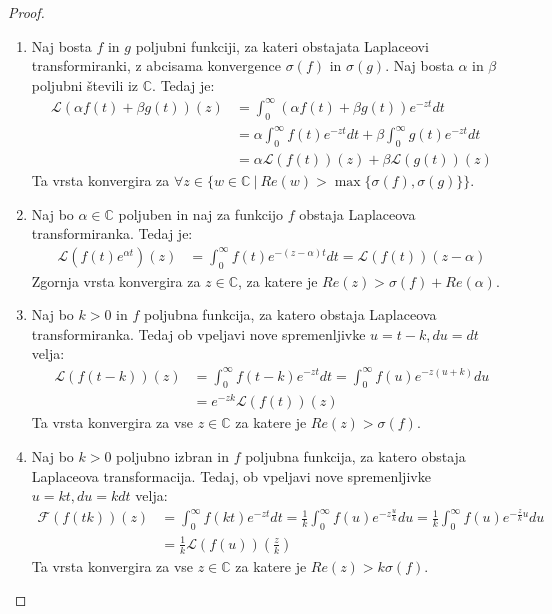 \documentclass[a4paper, 10pt]{article}
\newcommand{\mth}[1]{\ensuremath{\mathbb{#1}}}
\newcommand{\C}{\mth{C}}
\begin{document}
			\begin{proof}
				\begin{enumerate}
					\item Naj bosta $f$ in $g$ poljubni funkciji, za kateri obstajata Laplaceovi transformiranki, z abcisama konvergence $\sigma(f)$ in $\sigma(g)$. Naj bosta $\alpha$ in $\beta$ poljubni števili iz $\C$. Tedaj je: \begin{align*}
						\mathcal{L}(\alpha f(t) + \beta g(t))(z) &= \int_{0}^{\infty}(\alpha f(t) + \beta g(t))e^{-zt}dt \\
						&= \alpha\int_{0}^{\infty}f(t)e^{-zt}dt + \beta\int_{0}^{\infty}g(t)e^{-zt}dt \\
						&= \alpha\mathcal{L}(f(t))(z) + \beta\mathcal{L}(g(t))(z)
					\end{align*}
					Ta vrsta konvergira za $\forall z\in\{w\in\C~|~Re(w) > \max\{\sigma(f), \sigma(g)\}\}$.
					\item Naj bo $\alpha\in\C$ poljuben in naj za funkcijo $f$ obstaja Laplaceova transformiranka. Tedaj je: 		\begin{align*}
						\mathcal{L}(f(t)e^{\alpha t})(z) &= \int_{0}^{\infty}f(t)e^{-(z-\alpha)t}dt = \mathcal{L}(f(t))(z-\alpha)
					\end{align*}
					Zgornja vrsta konvergira za $z\in\C$, za katere je $Re(z) > \sigma(f) + Re(\alpha)$.
					\item Naj bo $k>0$ in $f$ poljubna funkcija, za katero obstaja Laplaceova transformiranka. Tedaj ob vpeljavi nove spremenljivke $u = t-k, du = dt$ velja: \begin{align*}
						\mathcal{L}(f(t-k))(z) &= \int_{0}^{\infty}f(t-k)e^{-zt}dt = \int_{0}^{\infty}f(u)e^{-z(u+k)}du \\
						&= e^{-zk}\mathcal{L}(f(t))(z)
					\end{align*}
					Ta vrsta konvergira za vse $z\in\C$ za katere je $Re(z) > \sigma(f)$.
					\item Naj bo $k>0$ poljubno izbran in $f$ poljubna funkcija, za katero obstaja Laplaceova transformacija. Tedaj, ob vpeljavi nove spremenljivke $u = kt, du = kdt$ velja:
					\begin{align*}
						\mathcal{F}(f(tk))(z) &= \int_0^\infty f(kt)e^{-zt}dt = \frac{1}{k}\int_{0}^{\infty}f(u)e^{-z\frac{u}{k}}du = \frac{1}{k}\int_{0}^{\infty}f(u)e^{-\frac{z}{k}u}du \\
						&=\frac{1}{k}\mathcal{L}(f(u))(\frac{z}{k})
					\end{align*}
					Ta vrsta konvergira za vse $z\in\C$ za katere je $Re(z) > k\sigma(f)$.

\end{enumerate}
\end{proof}
\end{document}
